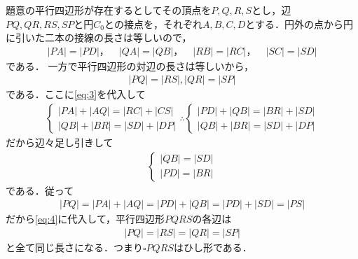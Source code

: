 \documentclass[../../main.tex]{subfiles}
\begin{document}
題意の平行四辺形が存在するとしてその頂点を$P,Q,R,S$とし，辺$PQ,QR,RS,SP$と円$C_0$との接点を，それぞれ$A,B,C,D$とする．円外の点から円に引いた二本の接線の長さは等しいので，
\begin{align}
  |PA|=|PD|，\quad |QA|=|QB|，\quad
  |RB|=|RC|，\quad |SC|=|SD| \label{eq:3}
\end{align}
である．
一方で平行四辺形の対辺の長さは等しいから，
\begin{align}
  |PQ|=|RS|, |QR|=|SP| \label{eq:4}
\end{align}
である．ここに\cref{eq:3}を代入して
\begin{align}
  \begin{cases}
    |PA|+|AQ| = |RC|+|CS| \\
    |QB|+|BR| = |SD|+|DP|
  \end{cases}
  \therefore
  \begin{cases}
    |PD|+|QB| = |BR|+|SD| \\
    |QB|+|BR| = |SD|+|DP|
  \end{cases}
\end{align}
だから辺々足し引きして
\begin{align}
  \begin{cases}
    |QB| = |SD| \\
    |PD| = |BR|
  \end{cases}
\end{align}
である．従って
\begin{align}
  |PQ| = |PA| + |AQ| = |PD|+|QB| = |PD|+|SD|=|PS|
\end{align}
だから\cref{eq:4}に代入して，平行四辺形$PQRS$の各辺は
\begin{align}
  |PQ|=|RS|=|QR|=|SP| \label{eq:5}
\end{align}
と全て同じ長さになる．つまり$\square PQRS$はひし形である．
\end{document}
